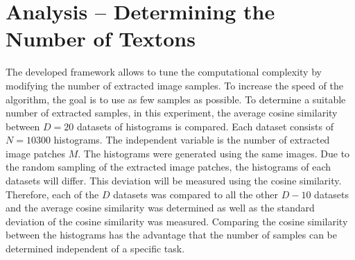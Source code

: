 \section{Analysis -- Determining the Number of Textons}
\label{sec:numtextons}

The developed framework allows to tune the computational complexity by
modifying the number of extracted image samples. To increase
the speed of the algorithm, the goal is to use as few samples as
possible. To determine a suitable number of extracted samples, in this
experiment, the average cosine similarity between $D = 20$ datasets of
histograms is compared. Each dataset consists of $N = 10300$
histograms. The independent variable is the number of extracted image
patches $M$. The histograms were generated using the same images. Due
to the random sampling of the extracted image patches, the histograms
of each datasets will differ. This deviation will be measured using
the cosine similarity. Therefore, each of the $D$ datasets was
compared to all the other $D - 10$ datasets and the average cosine
similarity was determined as well as the standard deviation of the
cosine similarity was measured. Comparing the cosine similarity
between the histograms has the advantage that the number of samples
can be determined independent of a specific task.